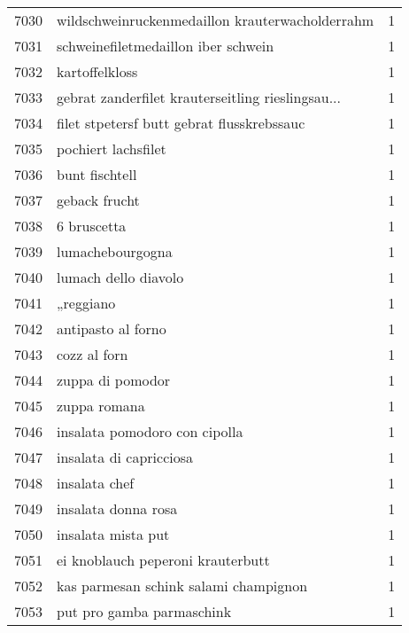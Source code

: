 \begin{tabular}{llr}
7030 &    wildschweinruckenmedaillon krauterwacholderrahm &      1 \\
7031 &                schweinefiletmedaillon iber schwein &      1 \\
7032 &                                     kartoffelkloss &      1 \\
7033 &  gebrat zanderfilet krauterseitling rieslingsau... &      1 \\
7034 &         filet stpetersf butt gebrat flusskrebssauc &      1 \\
7035 &                                pochiert lachsfilet &      1 \\
7036 &                                     bunt fischtell &      1 \\
7037 &                                      geback frucht &      1 \\
7038 &                                        6 bruscetta &      1 \\
7039 &                                   lumachebourgogna &      1 \\
7040 &                               lumach dello diavolo &      1 \\
7041 &                                          „reggiano &      1 \\
7042 &                                 antipasto al forno &      1 \\
7043 &                                       cozz al forn &      1 \\
7044 &                                   zuppa di pomodor &      1 \\
7045 &                                       zuppa romana &      1 \\
7046 &                      insalata pomodoro con cipolla &      1 \\
7047 &                            insalata di capricciosa &      1 \\
7048 &                                      insalata chef &      1 \\
7049 &                                insalata donna rosa &      1 \\
7050 &                                 insalata mista put &      1 \\
7051 &                  ei knoblauch peperoni krauterbutt &      1 \\
7052 &              kas parmesan schink salami champignon &      1 \\
7053 &                          put pro gamba parmaschink &      1 \\

\end{tabular}
